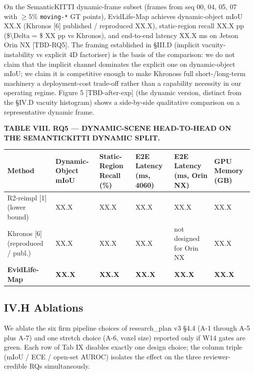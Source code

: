 \documentclass[
]{article}
\newcounter{none} %
\begin{document}
On the SemanticKITTI dynamic-frame subset (frames from seq 00, 04, 05,
07 with \(\ge 5\%\) \texttt{moving-*} GT points), EvidLife-Map achieves
dynamic-object mIoU XX.X (Khronos {[}6{]} published / reproduced XX.X),
static-region recall XX.X pp (\$\textbackslash Delta = \$ XX pp vs
Khronos), and end-to-end latency XX.X ms on Jetson Orin NX
{[}TBD-RQ5{]}. The framing established in §III.D (implicit
vacuity-instability vs explicit 4D factoriser) is the basis of the
comparison: we do not claim that the implicit channel dominates the
explicit one on dynamic-object mIoU; we claim it is competitive enough
to make Khronos\textquotesingle s full short-/long-term machinery a
deployment-cost trade-off rather than a capability necessity in our
operating regime. Figure 5 {[}TBD-after-exp{]} (the dynamic version,
distinct from the §IV.D vacuity histogram) shows a side-by-side
qualitative comparison on a representative dynamic frame.

\textbf{TABLE VIII. RQ5 --- DYNAMIC-SCENE HEAD-TO-HEAD ON THE
SEMANTICKITTI DYNAMIC SPLIT.}

{\def\LTcaptype{none} %
\begin{longtable}[]{@{}llllll@{}}
\toprule\noalign{}
Method & Dynamic-Object mIoU & Static-Region Recall (\%) & E2E Latency
(ms, 4060) & E2E Latency (ms, Orin NX) & GPU Memory (GB) \\
\midrule\noalign{}
\endhead
\bottomrule\noalign{}
\endlastfoot
R2-reimpl {[}1{]} (lower bound) & XX.X & XX.X & XX.X & XX.X & XX.X \\
Khronos {[}6{]} (reproduced / publ.) & XX.X & XX.X & XX.X & not designed
for Orin NX & XX.X \\
\textbf{EvidLife-Map} & \textbf{XX.X} & \textbf{XX.X} & \textbf{XX.X} &
\textbf{XX.X} & \textbf{XX.X} \\
\end{longtable}
}

\subsection{IV.H Ablations}\label{ivh-ablations}

We ablate the six firm pipeline choices of research\_plan v3 §4.4 (A-1
through A-5 plus A-7) and one stretch choice (A-6, voxel size) reported
only if W14 gates are green. Each row of Tab IX disables exactly one
design choice; the column triple (mIoU / ECE / open-set AUROC) isolates
the effect on the three reviewer-credible RQs simultaneously.
\end{document}
